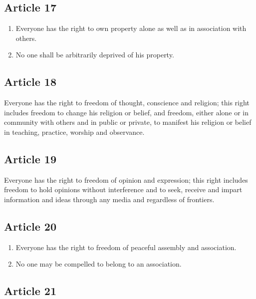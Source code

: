 \documentclass[
  titlepage,
  openright,
  DIV=calc,
  toc=listof,
  listof=nochaptergap]{scrbook}
\begin{document}
\hypertarget{article-17}{%
\subsection{Article 17}\label{article-17}}

\begin{enumerate}
\def\labelenumi{\arabic{enumi}.}
\item
  Everyone has the right to own property alone as well as in association
  with others.
\item
  No one shall be arbitrarily deprived of his property.
\end{enumerate}

\hypertarget{article-18}{%
\subsection{Article 18}\label{article-18}}

Everyone has the right to freedom of thought, conscience and religion;
this right includes freedom to change his religion or belief, and
freedom, either alone or in community with others and in public or
private, to manifest his religion or belief in teaching, practice,
worship and observance.

\hypertarget{article-19}{%
\subsection{Article 19}\label{article-19}}

Everyone has the right to freedom of opinion and expression; this right
includes freedom to hold opinions without interference and to seek,
receive and impart information and ideas through any media and
regardless of frontiers.

\hypertarget{article-20}{%
\subsection{Article 20}\label{article-20}}

\begin{enumerate}
\def\labelenumi{\arabic{enumi}.}
\item
  Everyone has the right to freedom of peaceful assembly and
  association.
\item
  No one may be compelled to belong to an association.
\end{enumerate}

\hypertarget{article-21}{%
\subsection{Article 21}\label{article-21}}
\end{document}
